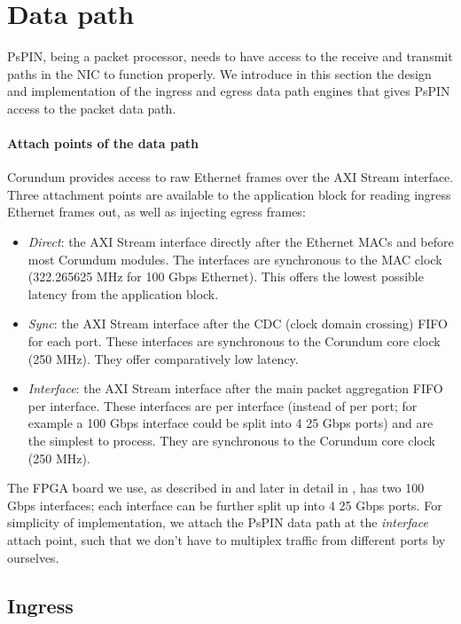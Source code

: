 \section{Data path}

PsPIN, being a packet processor, needs to have access to the receive and transmit paths in the NIC to function properly.  We introduce in this section the design and implementation of the ingress and egress data path engines that gives PsPIN access to the packet data path.

\paragraph{Attach points of the data path} Corundum provides access to raw Ethernet frames over the AXI Stream interface.  Three attachment points are available to the application block for reading ingress Ethernet frames out, as well as injecting egress frames:

\begin{itemize}
    \item \emph{Direct}: the AXI Stream interface directly after the Ethernet MACs and before most Corundum modules.  The interfaces are synchronous to the MAC clock (322.265625 MHz for 100 Gbps Ethernet).  This offers the lowest possible latency from the application block.
    \item \emph{Sync}: the AXI Stream interface after the CDC (clock domain crossing) FIFO for each port.  These interfaces are synchronous to the Corundum core clock (250 MHz).  They offer comparatively low latency.
    \item \emph{Interface}: the AXI Stream interface after the main packet aggregation FIFO per interface.  These interfaces are per interface (instead of per port; for example a 100 Gbps interface could be split into 4 25 Gbps ports) and are the simplest to process.  They are synchronous to the Corundum core clock (250 MHz).
\end{itemize}

The FPGA board we use, as described in  and later in detail in , has two 100 Gbps interfaces; each interface can be further split up into 4 25 Gbps ports.  For simplicity of implementation, we attach the PsPIN data path at the \emph{interface} attach point, such that we don't have to multiplex traffic from different ports by ourselves.

\subsection{Ingress}

